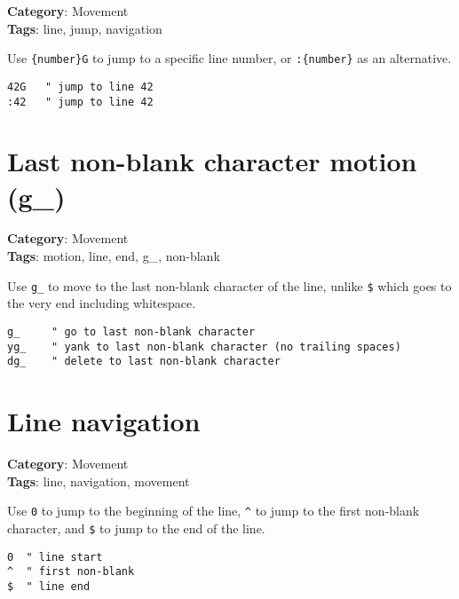 {{{{{{{\textbf{Category}: Movement\\ \textbf{Tags}: line, jump, navigation
\vspace{0.5cm}

Use {\footnotesize \Verb§{number}G§} to jump to a specific line number, or {\footnotesize \Verb§:{number}§} as an alternative.

\begin{Exa*}{}
\begin{Verbatim}[fontsize=\footnotesize, breaklines, breakanywhere]
42G   " jump to line 42
:42   " jump to line 42
\end{Verbatim}
\end{Exa*}

\section{Last non-blank character motion (g\_)}

\textbf{Category}: Movement\\ \textbf{Tags}: motion, line, end, g\_, non-blank
\vspace{0.5cm}

Use {\footnotesize \Verb§g_§} to move to the last non-blank character of the line, unlike {\footnotesize \Verb§$§} which goes to the very end including whitespace.

\begin{Exa*}{}
\begin{Verbatim}[fontsize=\footnotesize, breaklines, breakanywhere]
g_     " go to last non-blank character
yg_    " yank to last non-blank character (no trailing spaces)
dg_    " delete to last non-blank character
\end{Verbatim}
\end{Exa*}

\section{Line navigation}

\textbf{Category}: Movement\\ \textbf{Tags}: line, navigation, movement
\vspace{0.5cm}

Use {\footnotesize \Verb§0§} to jump to the beginning of the line, {\footnotesize \Verb§^§} to jump to the first non-blank character, and {\footnotesize \Verb§$§} to jump to the end of the line.

\begin{Exa*}{}
\begin{Verbatim}[fontsize=\footnotesize, breaklines, breakanywhere]
0  " line start
^  " first non-blank
$  " line end
\end{Verbatim}
\end{Exa*}

}}}}}}}
